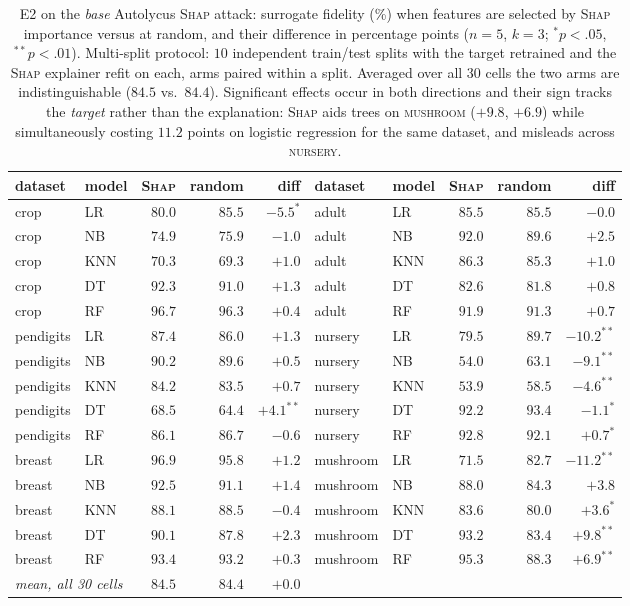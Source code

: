 \documentclass[sigconf,anonymous,review]{acmart}
\begin{document}
\begin{table}[t]
\centering
\caption{E2 on the \emph{base} Autolycus \textsc{Shap} attack: surrogate fidelity (\%) when features
are selected by \textsc{Shap} importance versus at random, and their difference in percentage points
($n{=}5$, $k{=}3$; $^{*}p{<}.05$, $^{**}p{<}.01$). Multi-split protocol: $10$ independent train/test
splits with the target retrained and the \textsc{Shap} explainer refit on each, arms paired within a
split. Averaged over all $30$ cells the two arms are indistinguishable ($84.5$ vs.\ $84.4$).
Significant effects occur in both directions and their sign tracks the \emph{target} rather than the
explanation: \textsc{Shap} aids trees on \textsc{mushroom} ($+9.8$, $+6.9$) while simultaneously
costing $11.2$ points on logistic regression for the same dataset, and misleads across
\textsc{nursery}.}
\label{tab:shap-attr}
\begin{tabular}{llrrr@{\hskip 2em}llrrr}
\toprule
dataset & model & \textsc{Shap} & random & diff & dataset & model & \textsc{Shap} & random & diff \\
\midrule
crop & LR & $80.0$ & $85.5$ & $-5.5^{*}$  & adult & LR & $85.5$ & $85.5$ & $-0.0$ \\
crop & NB & $74.9$ & $75.9$ & $-1.0$  & adult & NB & $92.0$ & $89.6$ & $+2.5$ \\
crop & KNN & $70.3$ & $69.3$ & $+1.0$  & adult & KNN & $86.3$ & $85.3$ & $+1.0$ \\
crop & DT & $92.3$ & $91.0$ & $+1.3$  & adult & DT & $82.6$ & $81.8$ & $+0.8$ \\
crop & RF & $96.7$ & $96.3$ & $+0.4$  & adult & RF & $91.9$ & $91.3$ & $+0.7$ \\
pendigits & LR & $87.4$ & $86.0$ & $+1.3$  & nursery & LR & $79.5$ & $89.7$ & $-10.2^{**}$ \\
pendigits & NB & $90.2$ & $89.6$ & $+0.5$  & nursery & NB & $54.0$ & $63.1$ & $-9.1^{**}$ \\
pendigits & KNN & $84.2$ & $83.5$ & $+0.7$  & nursery & KNN & $53.9$ & $58.5$ & $-4.6^{**}$ \\
pendigits & DT & $68.5$ & $64.4$ & $+4.1^{**}$  & nursery & DT & $92.2$ & $93.4$ & $-1.1^{*}$ \\
pendigits & RF & $86.1$ & $86.7$ & $-0.6$  & nursery & RF & $92.8$ & $92.1$ & $+0.7^{*}$ \\
breast & LR & $96.9$ & $95.8$ & $+1.2$  & mushroom & LR & $71.5$ & $82.7$ & $-11.2^{**}$ \\
breast & NB & $92.5$ & $91.1$ & $+1.4$  & mushroom & NB & $88.0$ & $84.3$ & $+3.8$ \\
breast & KNN & $88.1$ & $88.5$ & $-0.4$  & mushroom & KNN & $83.6$ & $80.0$ & $+3.6^{*}$ \\
breast & DT & $90.1$ & $87.8$ & $+2.3$  & mushroom & DT & $93.2$ & $83.4$ & $+9.8^{**}$ \\
breast & RF & $93.4$ & $93.2$ & $+0.3$  & mushroom & RF & $95.3$ & $88.3$ & $+6.9^{**}$ \\
\midrule
\multicolumn{2}{l}{\emph{mean, all 30 cells}} & $84.5$ & $84.4$ & $+0.0$ & & & & & \\
\bottomrule
\end{tabular}
\end{table}
\end{document}
